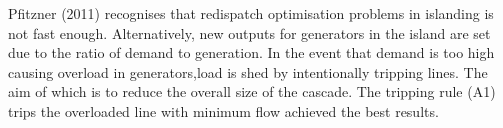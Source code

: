 \documentclass{article}
\begin{document}
Pfitzner (2011) recognises that redispatch optimisation problems in islanding is not fast enough. Alternatively, new outputs for generators in the island are set due to the ratio of demand to generation. In the event that demand is too high causing overload in generators,load is shed by intentionally tripping lines. The aim of which is to reduce the overall size of the cascade. The tripping rule (A1) trips the overloaded line with minimum flow achieved the best results.  
\end{document}
